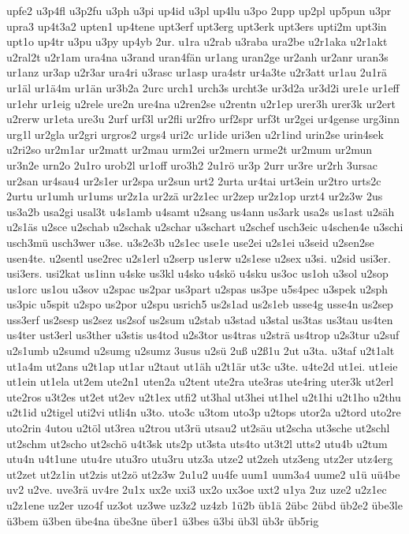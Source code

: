 {upfe2
u3p4fl
u3p2fu
u3ph
u3pi
up4id
u3pl
up4lu
u3po
2upp
up2pl
up5pun
u3pr
upra3
up4t3a2
upten1
up4tene
upt3erf
upt3erg
upt3erk
upt3ers
upti2m
upt3in
upt1o
up4tr
u3pu
u3py
up4yb
2ur.
u1ra
u2rab
u3raba
ura2be
u2r1aka
u2r1akt
u2ral2t
u2r1am
ura4na
u3rand
uran4fän
ur1ang
uran2ge
ur2anh
ur2anr
uran3s
ur1anz
ur3ap
u2r3ar
ura4ri
u3rasc
ur1asp
ura4str
ur4a3te
u2r3att
ur1au
2u1rä
ur1äl
ur1ä4m
ur1än
ur3b2a
2urc
urch1
urch3s
urcht3e
ur3d2a
ur3d2i
ure1e
ur1eff
ur1ehr
ur1eig
u2rele
ure2n
ure4na
u2ren2se
u2rentn
u2r1ep
urer3h
urer3k
ur2ert
u2rerw
ur1eta
ure3u
2urf
urf3l
ur2fli
ur2fro
urf2spr
urf3t
ur2gei
ur4gense
urg3inn
urg1l
ur2gla
ur2gri
urgros2
urgs4
uri2c
ur1ide
uri3en
u2r1ind
urin2se
urin4sek
u2ri2so
ur2m1ar
ur2matt
ur2mau
urm2ei
ur2mern
urme2t
ur2mum
ur2mun
ur3n2e
urn2o
2u1ro
urob2l
ur1off
uro3h2
2u1rö
ur3p
2urr
ur3re
ur2rh
3ursac
ur2san
ur4sau4
ur2s1er
ur2spa
ur2sun
urt2
2urta
ur4tai
urt3ein
ur2tro
urts2c
2urtu
ur1umh
ur1ums
ur2z1a
ur2zä
ur2z1ec
ur2zep
ur2z1op
urzt4
ur2z3w
2us
us3a2b
usa2gi
usal3t
u4s1amb
u4samt
u2sang
us4ann
us3ark
usa2s
us1ast
u2säh
u2s1äs
u2sce
u2schab
u2schak
u2schar
u3schart
u2schef
usch3eic
u4schen4e
u3schi
usch3mü
usch3wer
u3se.
u3s2e3b
u2s1ec
use1e
use2ei
u2s1ei
u3seid
u2sen2se
usen4te.
u2sentl
use2rec
u2s1erl
u2serp
us1erw
u2s1ese
u2sex
u3si.
u2sid
usi3er.
usi3ers.
usi2kat
us1inn
u4ske
us3kl
u4sko
u4skö
u4sku
us3oc
us1oh
u3sol
u2sop
us1orc
us1ou
u3sov
u2spac
us2par
us3part
u2spas
us3pe
u5s4pec
u3spek
u2sph
us3pic
u5spit
u2spo
us2por
u2spu
usrich5
us2s1ad
us2s1eb
usse4g
usse4n
us2sep
uss3erf
us2sesp
us2sez
us2sof
us2sum
u2stab
u3stad
u3stal
us3tas
us3tau
us4ten
us4ter
ust3erl
us3ther
u3stis
us4tod
u2s3tor
us4tras
u2strä
us4trop
u2s3tur
u2suf
u2s1umb
u2sumd
u2sumg
u2sumz
3usus
u2sü
2uß
u2ß1u
2ut
u3ta.
u3taf
u2t1alt
ut1a4m
ut2ans
u2t1ap
ut1ar
u2taut
ut1äh
u2t1är
ut3c
u3te.
u4te2d
ut1ei.
ut1eie
ut1ein
ut1ela
ut2em
ute2n1
uten2a
u2tent
ute2ra
ute3ras
ute4ring
uter3k
ut2erl
ute2ros
u3t2es
ut2et
ut2ev
u2t1ex
utfi2
ut3hal
ut3hei
ut1hel
u2t1hi
u2t1ho
u2thu
u2t1id
u2tigel
uti2vi
utli4n
u3to.
uto3c
u3tom
uto3p
u2tops
utor2a
u2tord
uto2re
uto2rin
4utou
u2töl
ut3rea
u2trou
ut3rü
utsau2
ut2säu
ut2scha
ut3sche
ut2schl
ut2schm
ut2scho
ut2schö
u4t3sk
uts2p
ut3sta
uts4to
ut3t2l
utts2
utu4b
u2tum
utu4n
u4t1une
utu4re
utu3ro
utu3ru
utz3a
utze2
ut2zeh
utz3eng
utz2er
utz4erg
ut2zet
ut2z1in
ut2zis
ut2zö
ut2z3w
2u1u2
uu4fe
uum1
uum3a4
uume2
u1ü
uü4be
uv2
u2ve.
uve3rä
uv4re
2u1x
ux2e
uxi3
ux2o
ux3oe
uxt2
u1ya
2uz
uze2
u2z1ec
u2z1ene
uz2er
uzo4f
uz3ot
uz3we
uz3z2
uz4zb
1ü2b
üb1ä
2übc
2übd
üb2e2
übe3le
ü3bem
ü3ben
übe4na
übe3ne
über1
ü3bes
ü3bi
üb3l
üb3r
üb5rig
}
